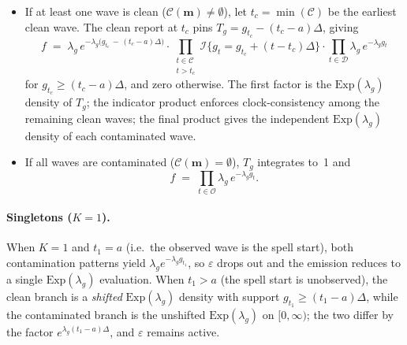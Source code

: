 \begin{itemize}
\item If at least one wave is clean
  (\(\mathcal{C}(\mathbf{m}) \neq \emptyset\)), let
  \(t_c = \min(\mathcal{C})\) be the earliest clean wave. The clean
  report at \(t_c\) pins \(T_g = g_{t_c} - (t_c - a)\Delta\), giving
  \begin{equation}
  f \;=\; \lambda_g\, e^{-\lambda_g\bigl(g_{t_c}\, -\, (t_c-a)\Delta\bigr)}
  \cdot \prod_{\substack{t \in \mathcal{C} \\[2pt] t > t_c}}
  \!\mathcal{I}\!\big\{g_t = g_{t_c} + (t - t_c)\Delta\big\}
  \cdot \prod_{t \in \mathcal{D}} \lambda_g\, e^{-\lambda_g g_t}
  \label{eq:per_pattern_density}
  \end{equation}
  for \(g_{t_c} \ge (t_c - a)\Delta\), and zero otherwise. The first
  factor is the \(\mathrm{Exp}(\lambda_g)\) density of \(T_g\); the
  indicator product enforces clock-consistency among the remaining
  clean waves; the final product gives the independent
  \(\mathrm{Exp}(\lambda_g)\) density of each contaminated wave.
\item If all waves are contaminated
  (\(\mathcal{C}(\mathbf{m}) = \emptyset\)), \(T_g\) integrates to~1 and
  \[
  f \;=\; \prod_{t \in \mathcal{O}} \lambda_g\, e^{-\lambda_g g_t}.
  \]
\end{itemize}

\paragraph{Singletons (\(K = 1\)).}
When \(K = 1\) and \(t_1 = a\) (i.e.\ the observed wave is the spell
start), both contamination patterns yield
\(\lambda_g e^{-\lambda_g g_{t_1}}\), so \(\varepsilon\) drops out and the
emission reduces to a single \(\mathrm{Exp}(\lambda_g)\) evaluation.
When \(t_1 > a\) (the spell start is unobserved), the clean branch is
a \emph{shifted} \(\mathrm{Exp}(\lambda_g)\) density with support
\(g_{t_1} \ge (t_1-a)\Delta\), while the contaminated branch is the
unshifted \(\mathrm{Exp}(\lambda_g)\) on \([0,\infty)\); the two differ
by the factor \(e^{\lambda_g (t_1-a)\Delta}\), and \(\varepsilon\)
remains active.

